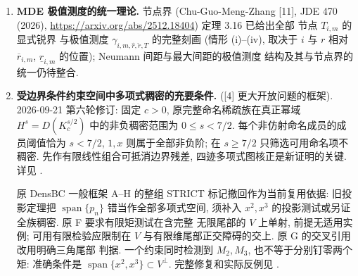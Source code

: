 \documentclass[UTF8]{ctexart}
\begin{document}
\begin{enumerate}
		$q\ge0$ (Gan-Zheng-Li-Shao 线 [8]) 与变号权重的最优常数与极值
		结构仍待确定.
	\item \textbf{MDE 极值测度的统一理论.}
		节点界 (Chu-Guo-Meng-Zhang [11], JDE 470 (2026),
		\url{https://arxiv.org/abs/2512.18404}) 定理 3.16 已给出全部
		节点 $T_{i,m}$ 的显式锐界
		与极值测度 $\gamma_{i,m,\hat r,\check r,T}$ 的完整刻画
		(情形 (i)--(iv), 取决于 $i$ 与 $r$ 相对 $\overline r_{i,m}$,
		$\underline r_{i,m}$ 的位置); Neumann 间距与最大间距的极值测度
		结构及其与节点界的统一仍待整合.
	\item \textbf{受边界条件约束空间中多项式稠密的充要条件.}
        ([4] 更大开放问题的框架). 2026-09-21 第六轮修订: 固定 $c>0$,
        原完整命名稀疏族在真正幂域 $H^s=D(K_c^{s/2})$ 中的非负稠密范围为
        $0\le s<7/2$. 每个非仿射命名成员的成员阈值恰为 $s<7/2$,
        $1,x$ 则属于全部非负阶; 在 $s\ge7/2$ 只筛选可用命名项不稠密.
        先作有限线性组合可抵消边界残差, 四迹多项式图核正是新证明的关键.
        详见 .

        原 DensBC 一般框架 A--H 的整组 STRICT 标记撤回作为当前复用依据:
        旧投影定理把 $\operatorname{span}\{p_n\}$ 错当作全部多项式空间, 须补入
        $x^2,x^3$ 的投影测试或另证全族稠密. 原 F 要求有限矩测试在含完整
        无限尾部的 $V$ 上单射, 前提无适用实例; 可用有限检验应限制在
        $V$ 与有限维尾部正交障碍的交上. 原 G 的交叉引用改用明确三角尾部
        判据. 一个约束同时检测到 $M_2,M_3$, 也不等于分别钉零两个矩:
        准确条件是 $\operatorname{span}\{x^2,x^3\}\subset V^\perp$.
        完整修复和实际反例见 .


\end{enumerate}
\end{document}
